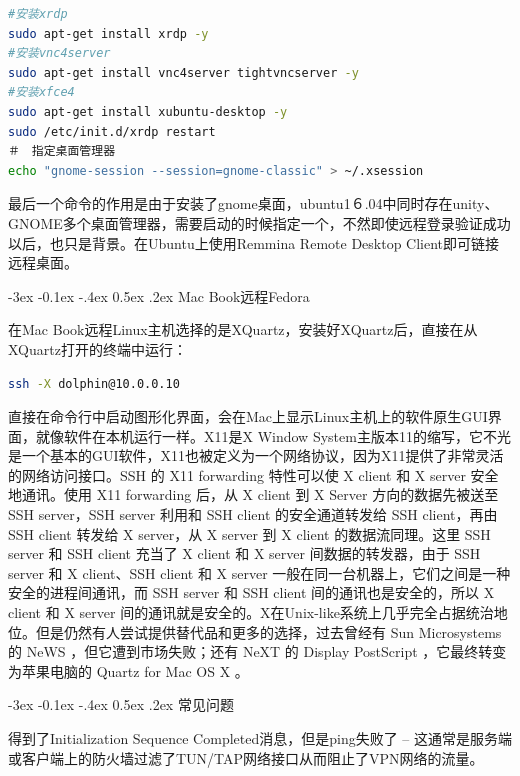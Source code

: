 \documentclass[12pt]{book}
\makeatletter
\numberwithin{dummy}{section}
\theoremstyle{ocrenumbox}
\theoremstyle{blacknumex}
\theoremstyle{blacknumbox}
\theoremstyle{ocrenum}
\renewcommand{\subsection}{\@startsection {subsection}{2}{\z@}
	{-3ex \@plus -0.1ex \@minus -.4ex}
	{0.5ex \@plus.2ex }
	{\normalfont\sffamily\bfseries}}
\makeatother
\begin{document}
\begin{lstlisting}[language=Bash]
#安装xrdp
sudo apt-get install xrdp -y
#安装vnc4server
sudo apt-get install vnc4server tightvncserver -y
#安装xfce4
sudo apt-get install xubuntu-desktop -y
sudo /etc/init.d/xrdp restart
＃　指定桌面管理器
echo "gnome-session --session=gnome-classic" > ~/.xsession
\end{lstlisting}

最后一个命令的作用是由于安装了gnome桌面，ubuntu1６.04中同时存在unity、GNOME多个桌面管理器，需要启动的时候指定一个，不然即使远程登录验证成功以后，也只是背景。在Ubuntu上使用Remmina Remote Desktop Client即可链接远程桌面。

\subsection{Mac Book远程Fedora}

在Mac Book远程Linux主机选择的是XQuartz，安装好XQuartz后，直接在从XQuartz打开的终端中运行：

\begin{lstlisting}[language=Bash]
ssh -X dolphin@10.0.0.10
\end{lstlisting}

直接在命令行中启动图形化界面，会在Mac上显示Linux主机上的软件原生GUI界面，就像软件在本机运行一样。X11是X Window System主版本11的缩写，它不光是一个基本的GUI软件，X11也被定义为一个网络协议，因为X11提供了非常灵活的网络访问接口。SSH 的 X11 forwarding 特性可以使 X client 和 X server 安全地通讯。使用 X11 forwarding 后，从 X client 到 X Server 方向的数据先被送至 SSH server，SSH server 利用和 SSH client 的安全通道转发给 SSH client，再由 SSH client 转发给 X server，从 X server 到 X client 的数据流同理。这里 SSH server 和 SSH client 充当了 X client 和 X server 间数据的转发器，由于 SSH server 和 X client、SSH client 和 X server 一般在同一台机器上，它们之间是一种安全的进程间通讯，而 SSH server 和 SSH client 间的通讯也是安全的，所以 X client 和 X server 间的通讯就是安全的。X在Unix-like系统上几乎完全占据统治地位。但是仍然有人尝试提供替代品和更多的选择，过去曾经有 Sun Microsystems 的 NeWS ，但它遭到市场失败；还有 NeXT 的 Display PostScript ，它最终转变为苹果电脑的 Quartz for Mac OS X 。

\subsection{常见问题}

得到了Initialization Sequence Completed消息，但是ping失败了 -- 这通常是服务端或客户端上的防火墙过滤了TUN/TAP网络接口从而阻止了VPN网络的流量。  
\end{document}
